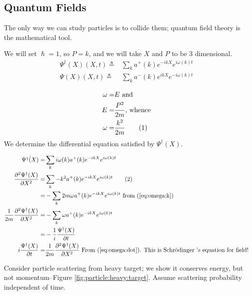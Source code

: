 \documentclass[]{article}
\newcommand\numberthis{\addtocounter{equation}{1}\tag{\theequation}}
\newcommand{\Schr}{{Schr\"odinger }}
\begin{document}
\subsection{Quantum Fields}

The only way we can study particles is to collide them; quantum field theory is the mathematical tool.

We will set $\hslash=1$, so $P=k$, and we will take $X$ and $P$ to be 3 dimensional.
\begin{align*}
\Psi^\dagger(X)(X,t) \triangleq& \sum_k a^+(k) e^{-ikX} e^{i \omega(k) t} \\
\Psi(X)(X,t) \triangleq& \sum_k a^-(k) e^{ikX} e^{- i \omega(k) t}
\end{align*}

\begin{align*}
\omega =& E \text{ and}\\
E =& \frac{P^2}{2m} \text{, whence}\\
\omega =& \frac{k^2}{2m} \numberthis \label{eq:omega:k}
\end{align*}
We  determine the differential equation satisfied by $\Psi^\dagger(X)$.

\begin{align*}
\dot{\Psi^\dagger(X)} =&  \sum_k i \omega(k) a^+(k) e^{-ikX} e^{i \omega(k) t}\\
\frac{\partial^2 \Psi^\dagger(X)}{\partial X^2} =& \sum_k -k^2 a^+(k) e^{-ikX} e^{i \omega(k) t} \numberthis \label{eq:omega:dot}\\
 =& - \sum_k 2m \omega a^+(k) e^{-ikX} e^{i \omega(k) t} \text{ from (\ref{eq:omega:k})}\\
 \frac{1}{2m} \frac{\partial^2 \Psi^\dagger(X)}{\partial X^2} =& - \sum_k \omega a^+(k) e^{-ikX} e^{i \omega(k) t}\\
 =& -\frac{1}{i} \frac{\Psi^\dagger(X)}{\partial t}\\
  i \frac{\Psi^\dagger(X)}{\partial t} =&  \frac{1}{2m} \frac{\partial^2 \Psi^\dagger(X)}{\partial X^2} \text{ From (\ref{eq:omega:dot}). This is \Schr's equation for field!}
\end{align*}

Consider particle scattering from heavy target; we show it conserves energy, but not momentum--Figure \ref{fig:particle:heavy:target}. Assume scattering probability independent of time.
\end{document}
